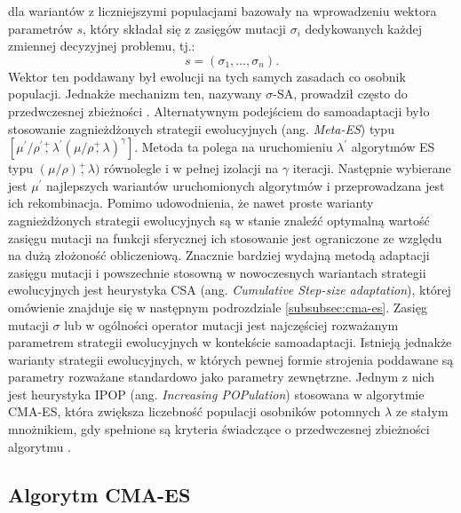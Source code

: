     dla wariantów z liczniejszymi populacjami bazowały na wprowadzeniu wektora parametrów $s$, który składał się z zasięgów mutacji $\sigma_{i}$ dedykowanych każdej zmiennej decyzyjnej problemu, tj.:
    \begin{equation*}
        s = (\sigma_1, \dots, \sigma_{n}).
    \end{equation*}
    Wektor ten poddawany był ewolucji na tych samych zasadach co osobnik populacji. Jednakże mechanizm ten, nazywany $\sigma$-SA, prowadził często do przedwczesnej zbieżności \soruce. Alternatywnym podejściem do samoadaptacji było stosowanie zagnieżdżonych strategii ewolucyjnych (ang. \textit{Meta-ES}) typu $[\mu^'/\rho^'\overset{+}{,}\lambda^'(\mu/\rho\overset{+}{,}\lambda)^{\gamma}]$. Metoda ta polega na uruchomieniu $\lambda^{'}$ algorytmów ES typu $(\mu/\rho)\overset{+}{,}\lambda)$
    równolegle i w pełnej izolacji na $\gamma$ iteracji. Następnie wybierane jest $\mu^{'}$ najlepszych wariantów uruchomionych algorytmów i przeprowadzana jest ich rekombinacja. Pomimo udowodnienia, że nawet proste warianty zagnieżdżonych strategii ewolucyjnych są w stanie znaleźć optymalną wartość zasięgu mutacji na funkcji sferycznej \source ich stosowanie jest ograniczone ze względu na dużą złożoność obliczeniową. Znacznie bardziej wydajną metodą adaptacji zasięgu mutacji i powszechnie stosowną w nowoczesnych wariantach strategii ewolucyjnych jest heurystyka CSA (ang. \textit{Cumulative Step-size adaptation}), której omówienie znajduje się w następnym podrozdziale \ref{subsubsec:cma-es}.
    Zasięg mutacji $\sigma$ lub w ogólności operator mutacji jest najczęściej rozważanym parametrem strategii ewolucyjnych w kontekście samoadaptacji. Istnieją jednakże warianty strategii ewolucyjnych, w których pewnej formie strojenia poddawane są parametry rozważane standardowo jako parametry zewnętrzne. Jednym z nich jest heurystyka IPOP (ang. \textit{Increasing POPulation}) stosowana w algorytmie CMA-ES, która zwiększa liczebność populacji osobników potomnych $\lambda$ ze stałym mnożnikiem, gdy spełnione są kryteria świadczące o przedwczesnej zbieżności algorytmu \source. 
    
    
    
\subsection{Algorytm CMA-ES}
\label{subsec:cma-es}



    

